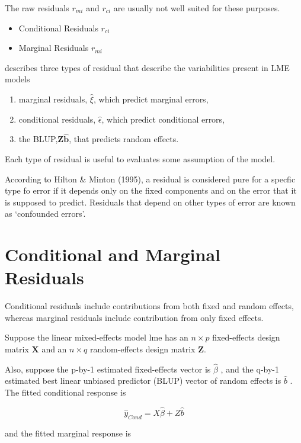 \documentclass[12pt, a4paper]{report}
\theoremstyle{plain}
\theoremstyle{definition}
\theoremstyle{remark}
\begin{document}
The raw residuals $r_{mi}$ and $r_{ci}$ are usually not well suited for these purposes.

\begin{itemize}
	\item Conditional Residuals $r_{ci}$
	\item Marginal Residuals $r_{mi}$
\end{itemize}


\citet{pb} describes three types of residual that describe the variabilities
present in LME models
\begin{enumerate}
	\item marginal residuals, $\hat{\xi}$, which predict marginal errors,
	\item conditional residuals, $\hat{\epsilon}$, which predict conditional errors,
	\item the BLUP,$\boldsymbol{Z\hat{b}}$, that predicts random effects.
\end{enumerate}
Each type of residual is useful to evaluates some assumption of the model.


According to Hilton \& Minton (1995), a residual is considered pure for a specfic type fo error
if it depends only on the fixed components and on the error that it is supposed to predict.
Residuals that depend on other types of error are known as `confounded errors'.



\section{Conditional and Marginal Residuals}
Conditional residuals include contributions from both fixed and random effects, whereas marginal residuals include contribution from only fixed effects.

Suppose the linear mixed-effects model lme has an $n \times p$ fixed-effects design matrix $\boldsymbol{X}$ and an $n \times q$ random-effects design matrix $\boldsymbol{Z}$. 

Also, suppose the p-by-1 estimated fixed-effects vector is $\hat{\beta}$ , and the q-by-1 estimated best linear unbiased predictor (BLUP) 
vector of random effects is $\hat{b}$ . The fitted conditional response is

\[ \hat{y}_{Cond} = X \hat{\beta} + Z \hat{b} \]

and the fitted marginal response is
\end{document}
